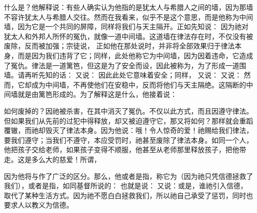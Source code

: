 什么是？他解释说：有些人确实认为他指的是犹太人与希腊人之间的墙，因为那墙不容许犹太人与希腊人交往。然而在我看来，似乎不是这个意思，而是他称为中间墙，因为它是一个共同的屏障，同样将我们与天主隔开。正如先知说： 因为祂对犹太人和外邦人所怀的冤仇，就像一道中间墙。这道墙在律法存在时，不仅没有被废除，反而被加强；宗徒说， 正如他在那处说时，并非将全部效果归于律法本身，而是因为我们违背了它；同样，此处他称它为中间墙，因为因着违命，它造成了冤仇。律法是一道篱笆，但这是为了安全而设，因此被称为，为了形成一道围墙。请再听先知的话： 又说： 因此此处它意味着安全；同样， 又说： 又说： 然而，它却成为中间墙，不再使他们在安稳中，反而将他们与天主隔绝。这隔断的中间墙就是由篱笆形成的。为了解释这是什么，他接着说：\par

如何废掉的？因祂被杀害，在其中消灭了冤仇。不仅以此方式，而且因遵守律法。但如果我们从先前的过犯中得释放，却又被迫遵守它，那又将如何？那样就会重蹈覆辙，而祂却毁灭了律法本身。因为他说：哦！令人惊奇的爱！祂赐给我们律法，要我们遵守；当我们不遵守，本应受罚时，祂甚至废除了律法本身。如同一个人，他把孩子交给老师，如果孩子变得不顺服，他甚至从老师那里释放孩子，把他带走。这是多么大的慈爱！所谓，\par

\par

因为他将与作了广泛的区分。那么，他或者是指，称它为（因为祂只凭信德拯救了我们），或者是指，如同基督所说的： 也就是说： 又说：或是，谁祂引入信德，取代了某种生活方式。因为祂不愿白白拯救我们，所以祂自己承受了惩罚，同时也要求人以教义为信德。\par

